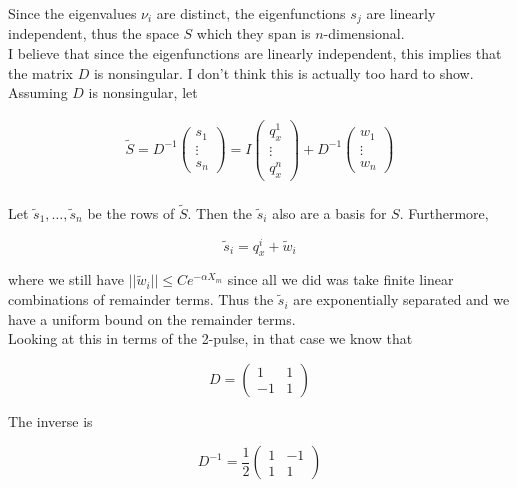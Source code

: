 \documentclass[12pt]{article}
\begin{document}
Since the eigenvalues $\nu_i$ are distinct, the eigenfunctions $s_j$ are linearly independent, thus the space $S$ which they span is $n$-dimensional.\\ 

I believe that since the eigenfunctions are linearly independent, this implies that the matrix $D$ is nonsingular. I don't think this is actually too hard to show.\\

Assuming $D$ is nonsingular, let  

\begin{align*}
\tilde{S} = 
D^{-1} \begin{pmatrix}s_1 \\ \vdots \\ s_n \end{pmatrix} 
= I \begin{pmatrix}q^1_x \\ \vdots \\ q^n_x \end{pmatrix} 
+ D^{-1} \begin{pmatrix}w_1 \\ \vdots \\ w_n \end{pmatrix}  \\ 
\end{align*}

Let $\tilde{s}_1, \dots, \tilde{s}_n$ be the rows of $\tilde{S}$. Then the $\tilde{s}_i$ also are a basis for $S$. Furthermore, 

\[
\tilde{s}_i = q^i_x + \tilde{w}_i
\]

where we still have $||\tilde{w}_i|| \leq C e^{-\alpha X_m}$ since all we did was take finite linear combinations of remainder terms. Thus the $\tilde{s}_i$ are exponentially separated and we have a uniform bound on the remainder terms.\\

Looking at this in terms of the 2-pulse, in that case we know that

\[
D = \begin{pmatrix} 1 & 1 \\ -1 & 1 \end{pmatrix}
\]

The inverse is

\[
D^{-1} = \frac{1}{2} \begin{pmatrix} 1 & -1 \\ 1 & 1 \end{pmatrix}
\]
\end{document}
